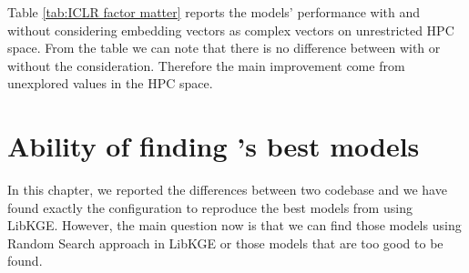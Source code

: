 \begin{table}[!htbp]
\centering
{}
\caption[Effect of considering embedding vectors as complex vectors]{The performance of models in FB15K-237 and WN18RR with and without considering embedding vectors as complex vectors. The \textit{Complex vector} indicates that considering the embedding vector as complex vector in penalty calculation. \textit{Yes} value means model considered embedding vectors as complex vectors while \textit{No} value means model does not consider embedding vectors as complex vectors. }
\label{tab:ICLR factor matter}
\end{table}

Table \ref{tab:ICLR factor matter} reports the models' performance with and without considering embedding vectors as complex vectors on unrestricted HPC space. From the table we can note that there is no difference between with or without the consideration. Therefore the main improvement come from unexplored values in the HPC space. 

\section[Finding ability of LibKGE]{Ability of finding \cite{chen2021relation}'s best models}

In this chapter, we reported the differences between two codebase and we have found exactly the configuration to reproduce the best models from \cite{chen2021relation} using LibKGE. However, the main question now is that we can find those models using Random Search approach in LibKGE or those models that are too good to be found. 

